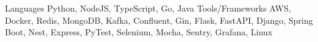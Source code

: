 \begin{cvskills}
  \cvskill
  {Languages}
  {Python, NodeJS, TypeScript, Go, Java}
  \cvskill
  {Tools/Frameworks}
  {AWS, Docker, Redis, MongoDB, Kafka, Confluent, Gin, Flask, FastAPI, Django, Spring Boot, Nest, Express, PyTest, Selenium, Mocha, Sentry, Grafana, Linux}
\end{cvskills}